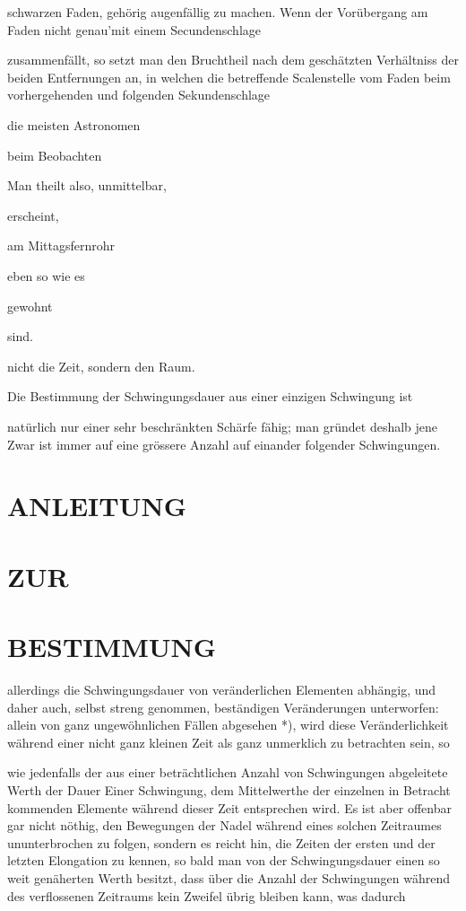\documentclass[12pt,a4paper]{article}
\begin{document}
schwarzen Faden, gehörig augenfällig zu machen. Wenn der Vorübergang am Faden nicht genau'mit einem Secundenschlage

zusammenfällt, so setzt man den Bruchtheil nach dem geschätzten Verhältniss der beiden Entfernungen an, in welchen die betreffende Scalenstelle vom Faden beim vorhergehenden und folgenden Sekundenschlage

die meisten Astronomen

beim Beobachten

Man theilt also, unmittelbar,

erscheint,

am Mittagsfernrohr

eben so wie es

gewohnt

sind.

nicht die Zeit, sondern den Raum.

Die Bestimmung der Schwingungsdauer aus einer einzigen Schwingung ist

natürlich nur einer sehr beschränkten Schärfe fähig; man gründet deshalb jene Zwar ist immer auf eine grössere Anzahl auf einander folgender Schwingungen.

\section*{ANLEITUNG}
\section*{ZUR}
\section*{BESTIMMUNG}
allerdings die Schwingungsdauer von veränderlichen Elementen abhängig, und daher auch, selbst streng genommen, beständigen Veränderungen unterworfen: allein von ganz ungewöhnlichen Fällen abgesehen *), wird diese Veränderlichkeit während einer nicht ganz kleinen Zeit als ganz unmerklich zu betrachten sein, so

wie jedenfalls der aus einer beträchtlichen Anzahl von Schwingungen abgeleitete Werth der Dauer Einer Schwingung, dem Mittelwerthe der einzelnen in Betracht kommenden Elemente während dieser Zeit entsprechen wird. Es ist aber offenbar gar nicht nöthig, den Bewegungen der Nadel während eines solchen Zeitraumes ununterbrochen zu folgen, sondern es reicht hin, die Zeiten der ersten und der letzten Elongation zu kennen, so bald man von der Schwingungsdauer einen so weit genäherten Werth besitzt, dass über die Anzahl der Schwingungen während des verflossenen Zeitraums kein Zweifel übrig bleiben kann, was dadurch
\end{document}
